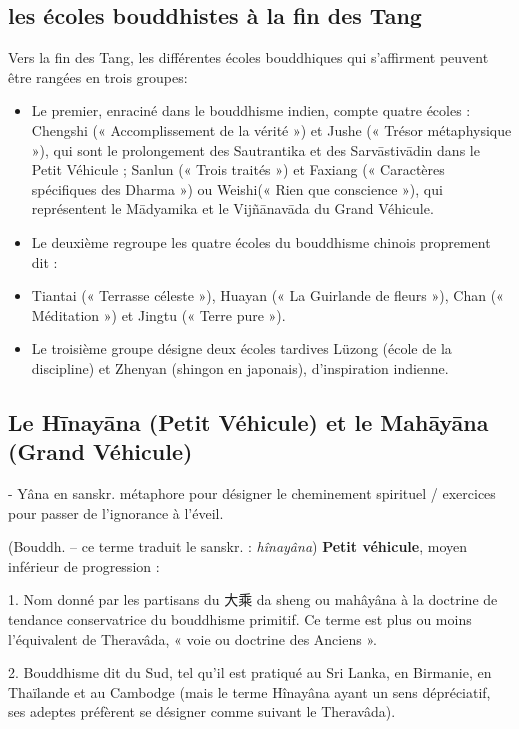 \subsection{les écoles bouddhistes à la fin des Tang}

Vers la fin des Tang, les différentes écoles bouddhiques qui s’affirment peuvent être rangées en trois groupes:
\begin{itemize}
    \item Le premier, enraciné dans le bouddhisme indien, compte quatre écoles : Chengshi (« Accomplissement de la vérité ») et Jushe (« Trésor métaphysique »), qui sont le prolongement des Sautrantika et des Sarvāstivādin dans le Petit Véhicule ; Sanlun (« Trois traités ») et Faxiang (« Caractères spécifiques des Dharma ») ou Weishi(« Rien que conscience »), qui représentent le Mādyamika et le Vijñānavāda du Grand Véhicule.
    \item Le deuxième regroupe les quatre écoles du bouddhisme chinois proprement dit :
    \item Tiantai (« Terrasse céleste »), Huayan (« La Guirlande de fleurs »), Chan (« Méditation ») et Jingtu (« Terre pure »).
    \item Le troisième groupe désigne deux écoles tardives Lüzong (école de la discipline) et Zhenyan (shingon en japonais), d’inspiration indienne.
\end{itemize}


\subsection{Le Hīnayāna (Petit Véhicule) et le Mahāyāna (Grand Véhicule)}

\begin{Def}[véhicule ] - Yâna en sanskr.
    métaphore pour désigner le cheminement spirituel / exercices pour passer de l'ignorance à l'éveil.
\end{Def}




\begin{Def}[xiaosheng 小乘]
    (Bouddh. – ce terme traduit le sanskr. : \textit{hînayâna}) \textbf{Petit véhicule}, moyen inférieur de progression :	
    
    1. Nom donné par les partisans du 大乘 da sheng ou mahâyâna à la doctrine de tendance conservatrice du bouddhisme primitif. Ce terme est plus ou moins l’équivalent de Theravâda, « voie ou doctrine des Anciens ». 
    
    2. Bouddhisme dit du Sud, tel qu’il est pratiqué au Sri Lanka, en Birmanie, en Thaïlande et au Cambodge (mais le terme Hînayâna ayant un sens dépréciatif, ses adeptes préfèrent se désigner comme suivant le Theravâda).
\end{Def}

